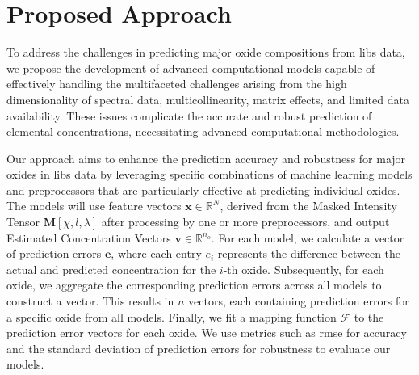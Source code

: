 \section{Proposed Approach}
To address the challenges in predicting major oxide compositions from \gls{libs} data, we propose the development of advanced computational models capable of effectively handling the multifaceted challenges arising from the high dimensionality of spectral data, multicollinearity, matrix effects, and limited data availability.
These issues complicate the accurate and robust prediction of elemental concentrations, necessitating advanced computational methodologies. 

Our approach aims to enhance the prediction accuracy and robustness for major oxides in \gls{libs} data by leveraging specific combinations of machine learning models and preprocessors that are particularly effective at predicting individual oxides.
The models will use feature vectors $\mathbf{x} \in \mathbb{R}^N$, derived from the Masked Intensity Tensor $\mathbf{M}[\chi, l, \lambda]$ after processing by one or more preprocessors, and output Estimated Concentration Vectors $\mathbf{v} \in \mathbb{R}^{n_o}$. 
For each model, we calculate a vector of prediction errors $\mathbf{e}$, where each entry $e_i$ represents the difference between the actual and predicted concentration for the $i$-th oxide. Subsequently, for each oxide, we aggregate the corresponding prediction errors across all models to construct a vector. 
This results in $n$ vectors, each containing prediction errors for a specific oxide from all models.
Finally, we fit a mapping function $\mathcal{F}$ to the prediction error vectors for each oxide.
We use metrics such as \gls{rmse} for accuracy and the standard deviation of prediction errors for robustness to evaluate our models.


